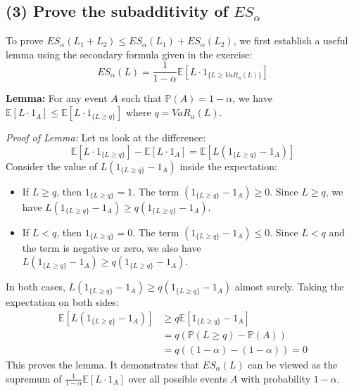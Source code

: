 \subsection*{(3) Prove the subadditivity of $ES_{\alpha}$}

To prove $ES_{\alpha}(L_1 + L_2) \le ES_{\alpha}(L_1) + ES_{\alpha}(L_2)$, we first establish a useful lemma using the secondary formula given in the exercise:
\begin{equation*}
ES_{\alpha}(L) = \frac{1}{1-\alpha} \mathbb{E}[L \cdot 1_{\{L \ge VaR_{\alpha}(L)\}}]
\end{equation*}

\textbf{Lemma:} For any event $A$ such that $\mathbb{P}(A) = 1 - \alpha$, we have $\mathbb{E}[L \cdot 1_A] \le \mathbb{E}[L \cdot 1_{\{L \ge q\}}]$ where $q = VaR_{\alpha}(L)$.

\textit{Proof of Lemma:} Let us look at the difference:
\begin{equation*}
\mathbb{E}[L \cdot 1_{\{L \ge q\}}] - \mathbb{E}[L \cdot 1_A] = \mathbb{E}[L (1_{\{L \ge q\}} - 1_A)]
\end{equation*}
Consider the value of $L (1_{\{L \ge q\}} - 1_A)$ inside the expectation:
\begin{itemize}
    \item If $L \ge q$, then $1_{\{L \ge q\}} = 1$. The term $(1_{\{L \ge q\}} - 1_A) \ge 0$. Since $L \ge q$, we have $L(1_{\{L \ge q\}} - 1_A) \ge q(1_{\{L \ge q\}} - 1_A)$.
    \item If $L < q$, then $1_{\{L \ge q\}} = 0$. The term $(1_{\{L \ge q\}} - 1_A) \le 0$. Since $L < q$ and the term is negative or zero, we also have $L(1_{\{L \ge q\}} - 1_A) \ge q(1_{\{L \ge q\}} - 1_A)$.
\end{itemize}
In both cases, $L(1_{\{L \ge q\}} - 1_A) \ge q(1_{\{L \ge q\}} - 1_A)$ almost surely.
Taking the expectation on both sides:
\begin{align*}
\mathbb{E}[L(1_{\{L \ge q\}} - 1_A)] &\ge q \mathbb{E}[1_{\{L \ge q\}} - 1_A] \\
&= q (\mathbb{P}(L \ge q) - \mathbb{P}(A)) \\
&= q ((1-\alpha) - (1-\alpha)) = 0
\end{align*}
This proves the lemma. It demonstrates that $ES_{\alpha}(L)$ can be viewed as the supremum of $\frac{1}{1-\alpha}\mathbb{E}[L \cdot 1_A]$ over all possible events $A$ with probability $1-\alpha$.

